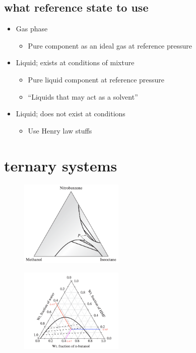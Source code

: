 \documentclass{article}
\begin{document}
\subsection*{what reference state to use}
\begin{itemize}
    \item Gas phase 
    \begin{itemize}
        \item Pure component as an ideal gas at reference pressure
    \end{itemize}
    \item Liquid; exists at conditions of mixture
    \begin{itemize}
        \item Pure liquid component at reference pressure
        \item “Liquids that may act as a solvent”
    \end{itemize}
    \item Liquid; does not exist at conditions
    \begin{itemize}
        \item Use Henry law stuffs
    \end{itemize}
\end{itemize}

\section*{ternary systems}
\begin{figure}[ht] %
    \includegraphics[width=0.442\textwidth, frame]{ternary1.png}
\end{figure}
\begin{figure}[ht] %
    \includegraphics[width=0.442\textwidth, frame]{ternary2.png}
\end{figure}
\end{document}
